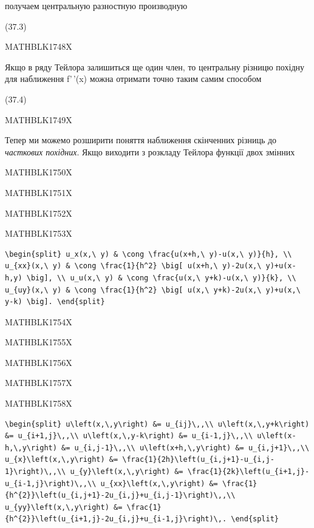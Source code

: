 \documentclass[
  ukrainian,
]{article}
\begin{document}
получаем центральную разностную производную

(37.3)

MATHBLK1748X

Якщо в ряду Тейлора залишиться ще один член, то центральну різницю
похідну для наближення f'\,'(x) можна отримати точно таким самим
способом

(37.4)

MATHBLK1749X

Тепер ми можемо розширити поняття наближення скінченних різниць до
\emph{часткових похідних}. Якщо виходити з розкладу Тейлора функції двох
змінних

MATHBLK1750X

MATHBLK1751X

MATHBLK1752X

MATHBLK1753X

\begin{verbatim}
\begin{split} u_x(x,\ y) & \cong \frac{u(x+h,\ y)-u(x,\ y)}{h}, \\ u_{xx}(x,\ y) & \cong \frac{1}{h^2} \big[ u(x+h,\ y)-2u(x,\ y)+u(x-h,y) \big], \\ u_u(x,\ y) & \cong \frac{u(x,\ y+k)-u(x,\ y)}{k}, \\ u_{uy}(x,\ y) & \cong \frac{1}{h^2} \big[ u(x,\ y+k)-2u(x,\ y)+u(x,\ y-k) \big]. \end{split}
\end{verbatim}

MATHBLK1754X

MATHBLK1755X

MATHBLK1756X

MATHBLK1757X

MATHBLK1758X

\begin{verbatim}
\begin{split} u\left(x,\,y\right) &= u_{ij}\,,\\ u\left(x,\,y+k\right) &= u_{i+1,j}\,,\\ u\left(x,\,y-k\right) &= u_{i-1,j}\,,\\ u\left(x-h,\,y\right) &= u_{i,j-1}\,,\\ u\left(x+h,\,y\right) &= u_{i,j+1}\,,\\ u_{x}\left(x,\,y\right) &= \frac{1}{2h}\left(u_{i,j+1}-u_{i,j-1}\right)\,,\\ u_{y}\left(x,\,y\right) &= \frac{1}{2k}\left(u_{i+1,j}-u_{i-1,j}\right)\,,\\ u_{xx}\left(x,\,y\right) &= \frac{1}{h^{2}}\left(u_{i,j+1}-2u_{i,j}+u_{i,j-1}\right)\,,\\ u_{yy}\left(x,\,y\right) &= \frac{1}{h^{2}}\left(u_{i+1,j}-2u_{i,j}+u_{i-1,j}\right)\,. \end{split}
\end{verbatim}
\end{document}
